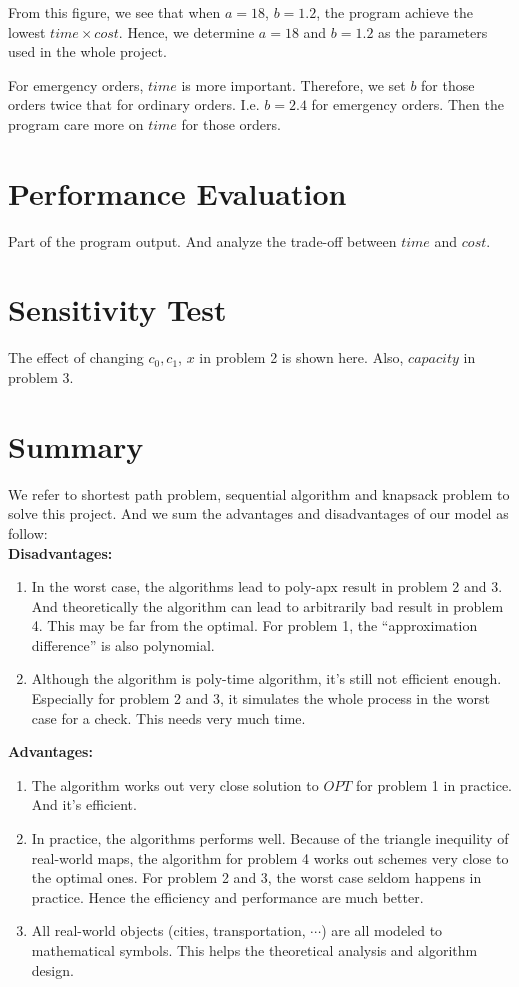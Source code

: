 \documentclass[11pt, a4paper]{article} %
\begin{document}
From this figure, we see that when $a=18$, $b=1.2$, the program achieve the lowest $time\times cost$. Hence, we determine $a=18$ and $b=1.2$ as the parameters used in the whole project.

For emergency orders, $time$ is more important. Therefore, we set $b$ for those orders twice that for ordinary orders. I.e. $b=2.4$ for emergency orders. Then the program care more on $time$ for those orders.

\section{Performance Evaluation}
Part of the program output. And analyze the trade-off between $time$ and $cost$.

\section{Sensitivity Test}
The effect of changing $c_0,c_1$, $x$ in problem 2 is shown here. Also, $capacity$ in problem 3.

\section{Summary}
We refer to shortest path problem, sequential algorithm and knapsack problem to solve this project. And we sum the advantages and disadvantages of our model as follow:\\
\textbf{Disadvantages:} 
\begin{enumerate}
	\item In the worst case, the algorithms lead to poly-apx result in problem 2 and 3. And theoretically the algorithm can lead to arbitrarily bad result in problem 4. This may be far from the optimal. For problem 1, the ``approximation difference'' is also polynomial.
	\item Although the algorithm is poly-time algorithm, it's still not efficient enough. Especially for problem 2 and 3, it simulates the whole process in the worst case for a check. This needs very much time.
\end{enumerate}
\textbf{Advantages:}
\begin{enumerate}
	\item The algorithm works out very close solution to $OPT$ for problem 1 in practice. And it's efficient.
	\item In practice, the algorithms performs well. Because of the triangle inequility of real-world maps, the algorithm for problem 4 works out schemes very close to the optimal ones. For problem 2 and 3, the worst case seldom happens in practice. Hence the efficiency and performance are much better.
	\item All real-world objects (cities, transportation, $\cdots$) are all modeled to mathematical symbols. This helps the theoretical analysis and algorithm design.
\end{enumerate}
\end{document}
